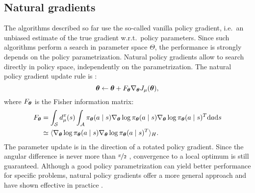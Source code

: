 \subsection{Natural gradients}
The algorithms described so far use the so-called vanilla policy gradient, i.e.\ an unbiased estimate of the true gradient w.r.t.\ policy parameters.
Since such algorithms perform a search in parameter space $\Theta$, the performance is strongly depends on the policy parametrization.
Natural policy gradients allow to search directly in policy space, independently on the parametrization. The natural policy gradient update rule is \cite{Kakade:2001}:
\[
	\boldsymbol{\theta} \gets \boldsymbol{\theta} + F_{\boldsymbol{\theta}}\nabla_{\boldsymbol{\theta}}J_\mu(\boldsymbol{\theta}),
\]
where $F_{\boldsymbol{\theta}}$ is the Fisher information matrix:
\begin{align*}
	F_{\boldsymbol{\theta}} &= \int_{\mathcal{S}}d_{\mu}^{\pi}(s)
			\int_{\mathcal{A}}\pi_{\boldsymbol{\theta}}(a \mid s)\nabla_{\boldsymbol{\theta}}\log\pi_{\boldsymbol{\theta}}(a \mid s)
			\nabla_{\boldsymbol{\theta}}\log\pi_{\boldsymbol{\theta}}(a \mid s)^T\mathrm{d}a\mathrm{d}s \\
			&\simeq \langle\nabla_{\boldsymbol{\theta}}\log\pi_{\boldsymbol{\theta}}(a \mid s)\nabla_{\boldsymbol{\theta}}\log\pi_{\boldsymbol{\theta}}(a \mid s)^T\rangle_H.
\end{align*}
The parameter update is in the direction of a rotated policy gradient. Since the angular difference is never more than $\nicefrac{\pi}{2}$ \cite{Amari1998natural}, convergence to a local optimum is still guaranteed. 
Although a good policy parametrization can yield better performance for specific problems, natural policy gradients offer a more general approach and have shown effective in practice \cite{Peters2008natural}.

